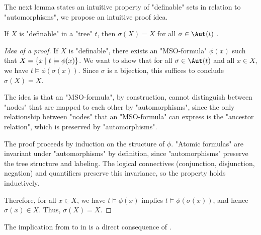 \documentclass[a4paper,UKenglish,cleveref, autoref, thm-restate]{lipics-v2021}
\begin{document}
The next lemma states an intuitive property of "definable" sets in relation to "automorphisms", we propose an intuitive proof idea.

\begin{lemma}\label{lem:def-aut}
	If $X$ is "definable" in a "tree" $t$, then $\sigma(X) = X$ for all $\sigma \in \Aut(t)$ .
\end{lemma}

\begin{proof}[Idea of a proof]
	If $X$ is "definable", there exists an "MSO-formula" $\phi(x)$ such that $X = \left\{x \mid t \models \phi(x)\right\}$.
	We want to show that for all $\sigma \in \Aut(t)$ and all $x \in X$, we have $t \models \phi(\sigma(x))$.
	Since $\sigma$ is a bijection, this suffices to conclude $\sigma(X) = X$.

	The idea is that an "MSO-formula", by construction, cannot distinguish between "nodes" that are mapped to each other by "automorphisms", since
	the only relationship between "nodes" that an "MSO-formula" can express is the "ancestor relation", which is preserved by "automorphisms".

	The proof proceeds by induction on the structure of $\phi$. "Atomic formulas" are invariant under "automorphisms" by definition,
	since "automorphisms" preserve the tree structure and labeling. The logical connectives (conjunction, disjunction, negation)
	and quantifiers preserve this invariance, so the property holds inductively.

	Therefore, for all $x \in X$, we have $t \models \phi(x)$ implies $t \models \phi(\sigma(x))$, and hence $\sigma(x) \in X$. Thus, $\sigma(X) = X$.
\end{proof}

The implication from  to  in  is a direct consequence of .
\end{document}

